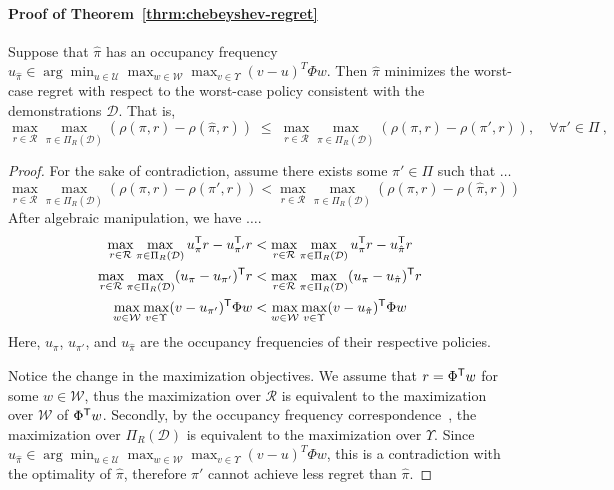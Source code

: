 \documentclass[11pt]{article}
\begin{document}
\paragraph{Proof of Theorem~\ref{thrm:chebeyshev-regret}}
Suppose that $\hat{\pi}$ has an occupancy frequency $u_{\hat{\pi}} \in \arg\min_{u \in \mathcal{U}} \max_{w \in \mathcal{W}} \max_{v \in \Upsilon} {(v - u)}^T \Phi w$.
Then $\hat{\pi}$ minimizes the worst-case regret with respect to the worst-case
policy consistent with the demonstrations $\mathcal{D}$. That is,
\[
	\max_{r\in \mathcal{R}} \max_{\pi \in \Pi_{R}(\mathcal{D})} \left(\rho(\pi, r) - \rho(\hat{\pi}, r)\right)
	\; \le\;
	\max_{r\in \mathcal{R}} \max_{\pi \in \Pi_{R}(\mathcal{D})} \left(\rho(\pi, r) - \rho(\pi', r)\right), \quad  \forall \pi' \in \Pi~,
\]
\begin{proof}
	For the sake of contradiction,
	assume there exists some $\pi' \in \Pi$ such that $\dots$
	\[
		\max_{r\in \mathcal{R}} \max_{\pi \in \Pi_{R}(\mathcal{D})}
		\left(\rho(\pi,r) - \rho(\pi', r)\right) < \max_{r\in \mathcal{R}}
		\max_{\pi \in \Pi_{R}(\mathcal{D})}
		\left(\rho(\pi, r) - \rho(\hat{\pi}, r)\right)
	\]
	After algebraic manipulation, we have $\dots$.
	\begin{align*}
		\max_{r\in \mathcal{R}} \max_{\pi \in \Pi_{R}
			(\mathcal{D})} u_{\pi}^{\mathsf{T}} r - u_{\pi'}^{\mathsf{T}} r
		 & < \max_{r\in \mathcal{R}}
		\max_{\pi \in \Pi_{R}
			(\mathcal{D})} u_{\pi}^{\mathsf{T}} r - u_{\hat{\pi}}
		^{\mathsf{T}} r                                              \\
		\max_{r\in \mathcal{R}} \max_{\pi \in \Pi_{R}(\mathcal{D})}
		(u_{\pi} - u_{\pi'})^{\mathsf{T}} r
		 & < \max_{r\in \mathcal{R}}
		\max_{\pi \in \Pi_{R}(\mathcal{D})}
		(u_{\pi} - u_{\hat{\pi}})^{\mathsf{T}} r
		\\
		\max_{w\in \mathcal{W}} \max_{v \in \Upsilon} (v - u_{\pi'})^{\mathsf{T}} \Phi w
		 & < \max_{w\in \mathcal{W}} \max_{v \in \Upsilon}
		(v - u_{\hat{\pi}})^{\mathsf{T}} \Phi w
	\end{align*}
	Here, $u_{\pi}$, $u_{\pi'}$, and $u_{\hat{\pi}}$
	are the occupancy frequencies of their respective policies.

	Notice the change in the maximization objectives.
	We assume that $r = \Phi^{\mathsf{T}} w$ for some $w \in \mathcal{W}$,
	thus the maximization over $\mathcal{R}$ is equivalent to the maximization
	over $\mathcal{W}$ of $\Phi^{\mathsf{T}} w$.
	Secondly, by the occupancy frequency correspondence~\cite{Puterman1994}, the
	maximization over $\Pi_R(\mathcal{D})$ is equivalent to the maximization over
	$\Upsilon$.
	Since $u_{\hat{\pi}} \in \arg\min_{u \in \mathcal{U}} \max_{w \in \mathcal{W}} \max_{v \in \Upsilon} {(v - u)}^T \Phi w$,
	this is a contradiction with the optimality of $\hat{\pi}$,
	therefore $\pi'$ cannot achieve less regret than $\hat{\pi}$.
\end{proof}
\end{document}
